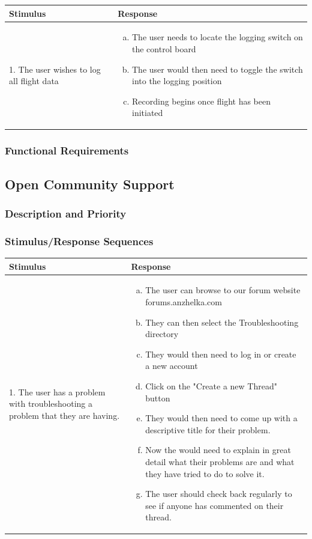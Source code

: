 \documentclass[english]{article}
\numberwithin{equation}{section} %
\begin{document}
\begin{longtable}{p{3cm} | p{10cm}}
\hline
\textbf{Stimulus} & \textbf{Response}\\
\hline
1. The user wishes to log all flight data &
\begin{enumerate}[(a)]\itemsep1pt %
\item The user needs to locate the logging switch on the control board
\item The user would then need to toggle the switch into the logging position
\item Recording begins once flight has been initiated
\end{enumerate}
\\ 
\hline
\end{longtable}



\subsubsection{Functional Requirements}
\bigskip
\subsection{Open Community Support}
\subsubsection{Description and Priority}
\subsubsection{Stimulus/Response Sequences}

\begin{longtable}{p{3cm} | p{10cm}}
\hline
\textbf{Stimulus} & \textbf{Response}\\
\hline
1. The user has a problem with troubleshooting a problem that they are having. &
\begin{enumerate}[(a)]\itemsep1pt %
\item The user can browse to our forum website forums.anzhelka.com
\item They can then select the Troubleshooting directory
\item They would then need to log in or create a new account
\item Click on the "Create a new Thread" button
\item They would then need to come up with a descriptive title for their problem.
\item Now the would need to explain in great detail what their problems are and what they have tried to do to solve it.
\item The user should check back regularly to see if anyone has commented on their thread.
\end{enumerate}
\\ 
\hline
\end{longtable}
\end{document}
